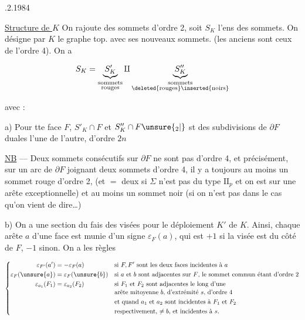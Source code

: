 
.2.1984

\uline{Structure de $K$} On rajoute des sommets d'ordre 2, soit $S_K$ l'ens des sommets. On désigne par $K$ le graphe top. avec ses nouveaux sommets. (les anciens sont ceux de l'ordre 4). On a

\[ S_K=\underbrace{S'_K}_{\substack{\text{sommets}\\\text{rouges}}}\amalg
\underbrace{S''_K}_{\substack{\text{sommets}\\\text{\deleted{rouges}\inserted{noirs}}}} \]


avec :

a) Pour tte  face $F$, $S'_K\cap F$ et $S''_K\cap F\unsure{_2|{}}$ st des subdivisions de $\partial F$ duales l'une de l'autre, d'ordre $2n$

 \uline{NB} --- Deux sommets consécutifs sur $\partial F$ ne sont pas d'ordre 4, et  précisément,  sur un arc de $\partial F$ joignant deux sommets d'ordre 4, il y a toujours au moins un sommet rouge d'ordre 2, (et $=$ deux si $\Sigma$ n'est pas  du type $\mathrm{II}_p$ et on est sur une arête exceptionnelle) et au moins un sommet noir (si on n'est  pas dans le cas qu'on vient de dire\ldots)

b)  On a une section du fais des visées pour le déploiement $K'$ de $K$. Ainsi, chaque arête $a$ d'une face  est munie d'un signe $\varepsilon_F(a)$, qui est \deleted{\unsure{$\pm$}}$+1$ si la visée est du côté de $F$, $-1$ sinon. On a les règles

\[
\left\{\begin{aligned}
\varepsilon_{F'}(a')&=-\varepsilon_F(a) &&\text{si $F,F'$ sont les deux faces incidentes à $a$}\\
\varepsilon_F(\unsure{a})&=\varepsilon_{F}(\unsure{b}) &&\text{si $a$ et $b$ sont adjacentes sur $F$, le sommet commun étant d'ordre 2}\\
\varepsilon_{a_1}(F_1)&=\varepsilon_{a_2}(F_2) &&\text{si $F_1$ et $F_2$ sont adjacentes le long d'une}\\[-2pt]
&&&\text{arête mitoyenne $b$, d'extrémité $s$, d'ordre 4}\\
&&&\text{et quand $a_1$ et $a_2$ sont incidentes à $F_1$ et $F_2$}\\
&&&\text{respectivement, $\ne b$, et incidentes à $s$.}
\end{aligned}\right.
\]

